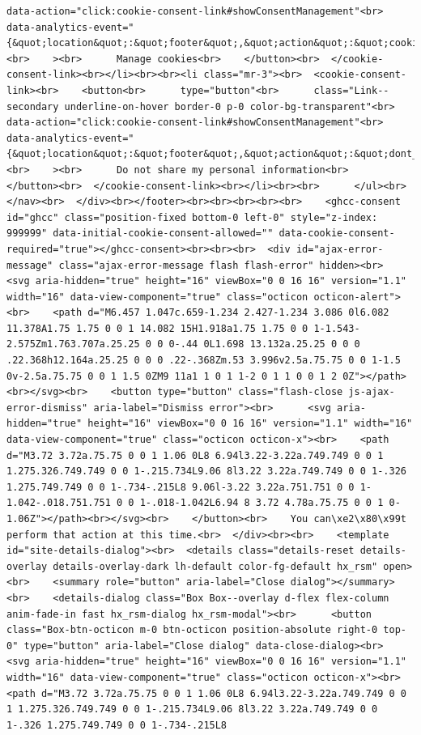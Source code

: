 \documentclass[
  letterpaper,
]{book}
\begin{document}
\begin{verbatim}
data-action="click:cookie-consent-link#showConsentManagement"<br>      data-analytics-event="{&quot;location&quot;:&quot;footer&quot;,&quot;action&quot;:&quot;cookies&quot;,&quot;context&quot;:&quot;subfooter&quot;,&quot;tag&quot;:&quot;link&quot;,&quot;label&quot;:&quot;cookies_link_subfooter_footer&quot;}"<br>    ><br>      Manage cookies<br>    </button><br>  </cookie-consent-link><br></li><br><br><li class="mr-3"><br>  <cookie-consent-link><br>    <button<br>      type="button"<br>      class="Link--secondary underline-on-hover border-0 p-0 color-bg-transparent"<br>      data-action="click:cookie-consent-link#showConsentManagement"<br>      data-analytics-event="{&quot;location&quot;:&quot;footer&quot;,&quot;action&quot;:&quot;dont_share_info&quot;,&quot;context&quot;:&quot;subfooter&quot;,&quot;tag&quot;:&quot;link&quot;,&quot;label&quot;:&quot;dont_share_info_link_subfooter_footer&quot;}"<br>    ><br>      Do not share my personal information<br>    </button><br>  </cookie-consent-link><br></li><br><br>      </ul><br>    </nav><br>  </div><br></footer><br><br><br><br><br>    <ghcc-consent id="ghcc" class="position-fixed bottom-0 left-0" style="z-index: 999999" data-initial-cookie-consent-allowed="" data-cookie-consent-required="true"></ghcc-consent><br><br><br>  <div id="ajax-error-message" class="ajax-error-message flash flash-error" hidden><br>    <svg aria-hidden="true" height="16" viewBox="0 0 16 16" version="1.1" width="16" data-view-component="true" class="octicon octicon-alert"><br>    <path d="M6.457 1.047c.659-1.234 2.427-1.234 3.086 0l6.082 11.378A1.75 1.75 0 0 1 14.082 15H1.918a1.75 1.75 0 0 1-1.543-2.575Zm1.763.707a.25.25 0 0 0-.44 0L1.698 13.132a.25.25 0 0 0 .22.368h12.164a.25.25 0 0 0 .22-.368Zm.53 3.996v2.5a.75.75 0 0 1-1.5 0v-2.5a.75.75 0 0 1 1.5 0ZM9 11a1 1 0 1 1-2 0 1 1 0 0 1 2 0Z"></path><br></svg><br>    <button type="button" class="flash-close js-ajax-error-dismiss" aria-label="Dismiss error"><br>      <svg aria-hidden="true" height="16" viewBox="0 0 16 16" version="1.1" width="16" data-view-component="true" class="octicon octicon-x"><br>    <path d="M3.72 3.72a.75.75 0 0 1 1.06 0L8 6.94l3.22-3.22a.749.749 0 0 1 1.275.326.749.749 0 0 1-.215.734L9.06 8l3.22 3.22a.749.749 0 0 1-.326 1.275.749.749 0 0 1-.734-.215L8 9.06l-3.22 3.22a.751.751 0 0 1-1.042-.018.751.751 0 0 1-.018-1.042L6.94 8 3.72 4.78a.75.75 0 0 1 0-1.06Z"></path><br></svg><br>    </button><br>    You can\xe2\x80\x99t perform that action at this time.<br>  </div><br><br>    <template id="site-details-dialog"><br>  <details class="details-reset details-overlay details-overlay-dark lh-default color-fg-default hx_rsm" open><br>    <summary role="button" aria-label="Close dialog"></summary><br>    <details-dialog class="Box Box--overlay d-flex flex-column anim-fade-in fast hx_rsm-dialog hx_rsm-modal"><br>      <button class="Box-btn-octicon m-0 btn-octicon position-absolute right-0 top-0" type="button" aria-label="Close dialog" data-close-dialog><br>        <svg aria-hidden="true" height="16" viewBox="0 0 16 16" version="1.1" width="16" data-view-component="true" class="octicon octicon-x"><br>    <path d="M3.72 3.72a.75.75 0 0 1 1.06 0L8 6.94l3.22-3.22a.749.749 0 0 1 1.275.326.749.749 0 0 1-.215.734L9.06 8l3.22 3.22a.749.749 0 0 1-.326 1.275.749.749 0 0 1-.734-.215L8 
\end{verbatim}
\end{document}
